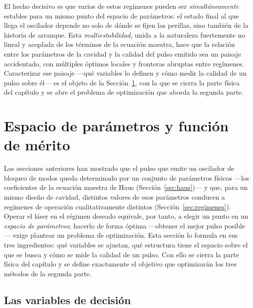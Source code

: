 El hecho decisivo es que varios de estos regímenes pueden ser
\emph{simultáneamente} estables para un mismo punto del espacio de parámetros: el
estado final al que llega el oscilador depende no solo de dónde se fijen las
perillas, sino también de la historia de arranque. Esta \emph{multiestabilidad},
unida a la naturaleza fuertemente no lineal y acoplada de los términos de la
ecuación maestra, hace que la relación entre los parámetros de la cavidad y la
calidad del pulso emitido sea un paisaje accidentado, con múltiples óptimos locales
y fronteras abruptas entre regímenes. Caracterizar ese paisaje —qué variables lo
definen y cómo medir la calidad de un pulso sobre él— es el objeto de la
Sección~\ref{sec:espacio_parametros}, con la que se cierra la parte física del
capítulo y se abre el problema de optimización que aborda la segunda parte.



\section{Espacio de parámetros y función de mérito}
\label{sec:espacio_parametros}

Las secciones anteriores han mostrado que el pulso que emite un oscilador de
bloqueo de modos queda determinado por un conjunto de parámetros físicos —los
coeficientes de la ecuación maestra de Haus (Sección~\ref{sec:haus})— y que, para
un mismo diseño de cavidad, distintos valores de esos parámetros conducen a
regímenes de operación cualitativamente distintos
(Sección~\ref{sec:regimenes}). Operar el láser en el régimen deseado equivale, por
tanto, a elegir un punto en un \emph{espacio de parámetros}; hacerlo de forma
óptima —obtener el mejor pulso posible— exige plantear un problema de optimización.
Esta sección lo formula en sus tres ingredientes: qué variables se ajustan, qué
estructura tiene el espacio sobre el que se busca y cómo se mide la calidad de un
pulso. Con ello se cierra la parte física del capítulo y se define exactamente el
objetivo que optimizarán los tres métodos de la segunda parte.

\subsection{Las variables de decisión}
\label{sec:variables}

